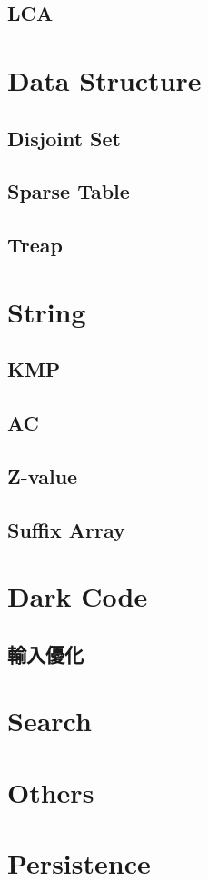 \subsection{LCA}


\section{Data Structure}

\subsection{Disjoint Set}

\subsection{Sparse Table}

\subsection{Treap}


\section{String}

\subsection{KMP}

\subsection{AC}

\subsection{Z-value}

\subsection{Suffix Array}


\section{Dark Code}

\subsection{輸入優化}


\section{Search}


\section{Others}


\section{Persistence}

